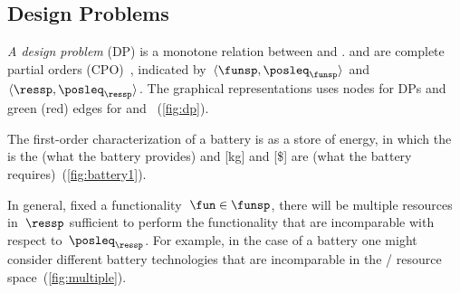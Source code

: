 \subsection{Design Problems\label{sec:Design-Problems}}

\emph{A design problem} (DP) is a monotone relation between \emph{}
and \emph{}.  and 
are complete partial orders (CPO)~\cite{davey02}, indicated by~$\langle\funsp,\posleq_{\funsp}\rangle$
and~$\langle\ressp,\posleq_{\ressp}\rangle$. The graphical representations
uses nodes for DPs and green (red) edges for  and
~(\cref{fig:dp}).

\begin{example}
The first-order characterization of a battery is as a store of energy,
in which the  is the  (what
the battery provides) and  {[}kg{]} and  {[}\${]}
are  (what the battery requires)~(\cref{fig:battery1}).
\end{example}

\noindent In general, fixed a functionality~$\fun\in\funsp$, there
will be multiple resources in~$\ressp$ sufficient to perform the
functionality that are incomparable with respect to~$\posleq_{\ressp}$.
For example, in the case of a battery one might consider different
battery technologies that are incomparable in the /
resource space~(\cref{fig:multiple}).


